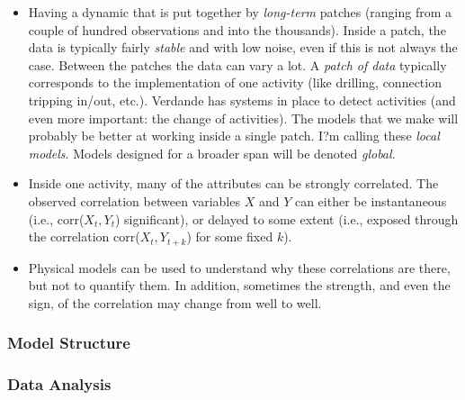 \begin{itemize}

\item Having a dynamic that is put together by \emph{long-term} patches (ranging from a couple of hundred observations and into the thousands). Inside a patch, the data is typically fairly \emph{stable} and with low noise, even if this is not always the case. Between the patches the data can vary a lot. A \emph{patch of data} typically corresponds to the implementation of one activity (like drilling, connection tripping in/out, etc.). Verdande has systems in place to detect activities (and even more important: the change of activities). The models that we make will probably be better at working inside a single patch. I?m calling these \emph{local models}. Models designed for a broader span will be denoted \emph{global}.

\item Inside one activity, many of the attributes can be strongly correlated. The observed correlation between variables $X$ and $Y$ can either be instantaneous (i.e., corr($X_t, Y_t$) significant), or delayed to some extent (i.e., exposed through the correlation corr($X_t, Y_{t+k}$) for some fixed $k$).

\item Physical models can be used to understand why these correlations are there, but not to quantify them. In addition, sometimes the strength, and even the sign, of the correlation may change from well to well.

\end{itemize}

\subsubsection*{Model Structure}






\subsubsection*{Data Analysis}




